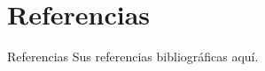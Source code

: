 \section{Referencias}
\begin{frame}{Referencias}
	Sus referencias bibliográficas aquí.
	
\end{frame}